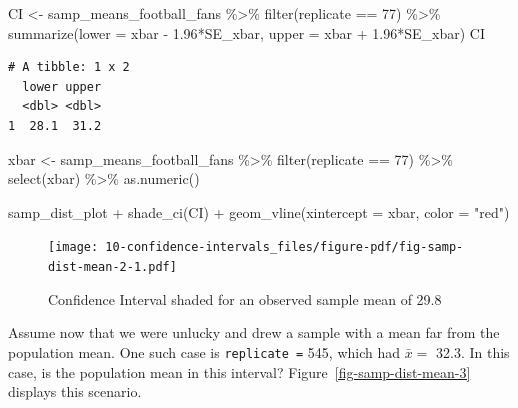 \documentclass[
  letterpaper,
  DIV=11,
  numbers=noendperiod]{scrreprt}
\newenvironment{Shaded}{\begin{snugshade}}{\end{snugshade}}
\newcommand{\AttributeTok}[1]{\textcolor[rgb]{0.40,0.45,0.13}{#1}}
\newcommand{\DecValTok}[1]{\textcolor[rgb]{0.68,0.00,0.00}{#1}}
\newcommand{\FloatTok}[1]{\textcolor[rgb]{0.68,0.00,0.00}{#1}}
\newcommand{\FunctionTok}[1]{\textcolor[rgb]{0.28,0.35,0.67}{#1}}
\newcommand{\NormalTok}[1]{\textcolor[rgb]{0.00,0.23,0.31}{#1}}
\newcommand{\OtherTok}[1]{\textcolor[rgb]{0.00,0.23,0.31}{#1}}
\newcommand{\SpecialCharTok}[1]{\textcolor[rgb]{0.37,0.37,0.37}{#1}}
\newcommand{\StringTok}[1]{\textcolor[rgb]{0.13,0.47,0.30}{#1}}
\theoremstyle{definition}
\theoremstyle{remark}
\begin{document}
\begin{Shaded}
\begin{Highlighting}[]
\NormalTok{CI }\OtherTok{\textless{}{-}}\NormalTok{ samp\_means\_football\_fans }\SpecialCharTok{\%\textgreater{}\%} 
  \FunctionTok{filter}\NormalTok{(replicate }\SpecialCharTok{==} \DecValTok{77}\NormalTok{) }\SpecialCharTok{\%\textgreater{}\%} 
  \FunctionTok{summarize}\NormalTok{(}\AttributeTok{lower =}\NormalTok{ xbar }\SpecialCharTok{{-}} \FloatTok{1.96}\SpecialCharTok{*}\NormalTok{SE\_xbar,}
            \AttributeTok{upper =}\NormalTok{ xbar }\SpecialCharTok{+} \FloatTok{1.96}\SpecialCharTok{*}\NormalTok{SE\_xbar)}
\NormalTok{CI}
\end{Highlighting}
\end{Shaded}

\begin{verbatim}
# A tibble: 1 x 2
  lower upper
  <dbl> <dbl>
1  28.1  31.2
\end{verbatim}

\begin{Shaded}
\begin{Highlighting}[]
\NormalTok{xbar }\OtherTok{\textless{}{-}}\NormalTok{ samp\_means\_football\_fans }\SpecialCharTok{\%\textgreater{}\%} 
  \FunctionTok{filter}\NormalTok{(replicate }\SpecialCharTok{==} \DecValTok{77}\NormalTok{) }\SpecialCharTok{\%\textgreater{}\%} 
  \FunctionTok{select}\NormalTok{(xbar) }\SpecialCharTok{\%\textgreater{}\%} 
  \FunctionTok{as.numeric}\NormalTok{()}

\NormalTok{samp\_dist\_plot }\SpecialCharTok{+}
  \FunctionTok{shade\_ci}\NormalTok{(CI) }\SpecialCharTok{+}
  \FunctionTok{geom\_vline}\NormalTok{(}\AttributeTok{xintercept =}\NormalTok{ xbar, }\AttributeTok{color =} \StringTok{"red"}\NormalTok{)}
\end{Highlighting}
\end{Shaded}

\begin{figure}[H]

{\centering \texttt{[image: 10-confidence-intervals\_files/figure-pdf/fig-samp-dist-mean-2-1.pdf]}

}

\caption{\label{fig-samp-dist-mean-2}Confidence Interval shaded for an
observed sample mean of 29.8}

\end{figure}

Assume now that we were unlucky and drew a sample with a mean far from
the population mean. One such case is \texttt{replicate\ =} 545, which
had \(\bar{x} =\) 32.3. In this case, is the population mean in this
interval? Figure~\ref{fig-samp-dist-mean-3} displays this scenario.
\end{document}
